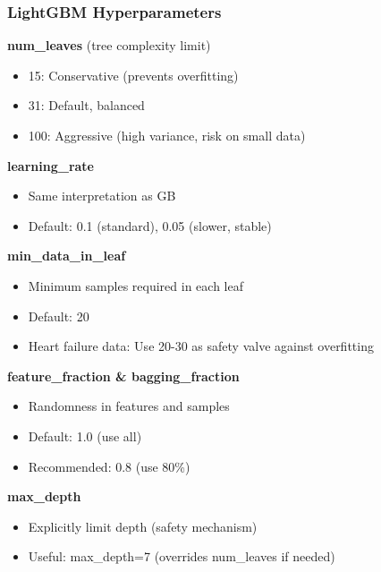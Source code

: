 \documentclass{beamer}
\begin{document}
\begin{frame}[fragile]
\frametitle{LightGBM Hyperparameters}

\textbf{num\_leaves} (tree complexity limit)
\begin{itemize}
    \item 15: Conservative (prevents overfitting)
    \item 31: Default, balanced
    \item 100: Aggressive (high variance, risk on small data)
\end{itemize}

\textbf{learning\_rate}
\begin{itemize}
    \item Same interpretation as GB
    \item Default: 0.1 (standard), 0.05 (slower, stable)
\end{itemize}

\textbf{min\_data\_in\_leaf}
\begin{itemize}
    \item Minimum samples required in each leaf
    \item Default: 20
    \item Heart failure data: Use 20-30 as safety valve against overfitting
\end{itemize}

\textbf{feature\_fraction \& bagging\_fraction}
\begin{itemize}
    \item Randomness in features and samples
    \item Default: 1.0 (use all)
    \item Recommended: 0.8 (use 80\%)
\end{itemize}

\textbf{max\_depth}
\begin{itemize}
    \item Explicitly limit depth (safety mechanism)
    \item Useful: max\_depth=7 (overrides num\_leaves if needed)
\end{itemize}

\end{frame}
\end{document}
